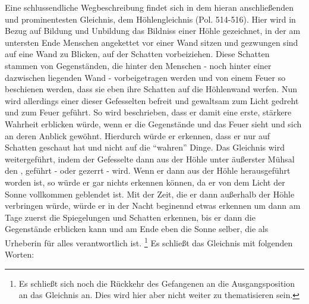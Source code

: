 Eine schlussendliche Wegbeschreibung findet sich in dem hieran anschließenden und prominentesten Gleichnis, dem Höhlengleichnis (Pol. 514-516).
Hier wird in Bezug auf Bildung und Unbildung das Bildniss einer Höhle gezeichnet, in der am untersten Ende Menschen angekettet vor einer Wand sitzen und gezwungen sind auf eine Wand zu Blicken, auf der Schatten vorbeiziehen. Diese Schatten stammen von Gegenständen, die hinter den Menschen - noch hinter einer dazwischen liegenden Wand - vorbeigetragen werden und von einem Feuer so beschienen werden, dass sie eben ihre Schatten auf die Höhlenwand werfen. Nun wird allerdings einer dieser Gefesselten befreit und gewaltsam zum Licht gedreht und zum Feuer geführt. So wird beschrieben, dass er damit eine erste, stärkere Wahrheit erblicken würde, wenn er die Gegenstände und das Feuer sieht und sich an deren Anblick gewöhnt. Hierdurch würde er erkennen, dass er nur auf Schatten geschaut hat und nicht auf die \enquote{wahren} Dinge. Das Gleichnis wird weitergeführt, indem der Gefesselte dann aus der Höhle unter äußerster Mühsal den , geführt - oder gezerrt - wird. Wenn er dann aus der Höhle herausgeführt worden ist, so würde er gar nichts erkennen können, da er von dem Licht der Sonne vollkommen geblendet ist. Mit der Zeit, die er dann außerhalb der Höhle verbringen würde, würde er in der Nacht beginennd etwas erkennen um dann am Tage zuerst die Spiegelungen und Schatten erkennen, bis er dann die Gegenstände erblicken kann und am Ende eben die Sonne selber, die als Urheberin für alles verantwortlich ist. \footnote{Es schließt sich noch die Rückkehr des Gefangenen an die Ausgangsposition an das Gleichnis an. Dies wird hier aber nicht weiter zu thematisieren sein.} Es schließt das Gleichnis mit folgenden Worten:
